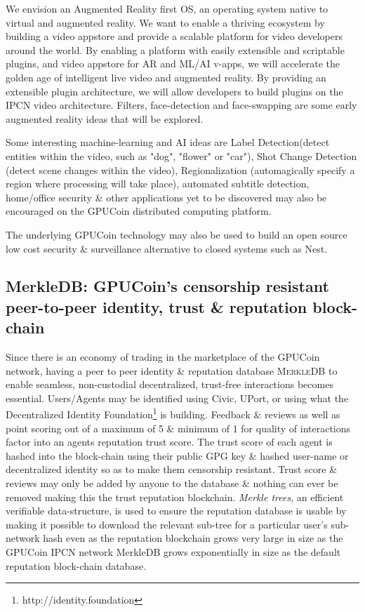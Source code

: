 \documentclass{article}
\begin{document}
We envision an Augmented Reality first OS, an operating system native to virtual and augmented reality. We want to enable a thriving ecosystem by building a video appstore and provide a scalable platform for video developers around the world. By enabling a platform with easily extensible and scriptable plugins, and video appstore for AR and ML/AI v-apps, we will accelerate the golden age of intelligent live video and augmented reality. By providing an extensible plugin architecture, we will allow developers to build plugins on the IPCN video architecture. Filters, face-detection and face-swapping are some early augmented reality ideas that will be explored.

Some interesting machine-learning and AI ideas are Label Detection(detect entities within the video, such as "dog", "flower" or "car"), Shot Change Detection (detect scene changes within the video), Regionalization (automagically specify a region where processing will take place), automated subtitle detection, home/office security \& other applications yet to be discovered may also be encouraged on the GPUCoin distributed computing platform.


The underlying GPUCoin technology may also be used to build an open source low cost security \& surveillance alternative to closed systems such as Nest.


\subsection{MerkleDB: GPUCoin's censorship resistant peer-to-peer identity, trust \& reputation block-chain}
Since there is an economy of trading in the marketplace of the GPUCoin network, having a peer to peer identity \& reputation database \textsc{MerkleDB} to enable seamless, non-custodial decentralized, trust-free interactions becomes essential. Users/Agents may be identified using Civic, UPort, or using what the Decentralized Identity Foundation\footnote{http://identity.foundation} is building. Feedback \& reviews as well as point scoring out of a maximum of 5 \& minimum of 1 for quality of interactions factor into an agents reputation trust score. The trust score of each agent is hashed into the block-chain using their public GPG key \& hashed user-name or decentralized identity so as to make them censorship resistant. Trust score \& reviews may only be added by anyone to the database \& nothing can ever be removed making this the trust reputation blockchain. \emph{Merkle trees}, an efficient verifiable data-structure, is used to ensure the reputation database is usable by making it possible to download the relevant sub-tree for a particular user's sub-network hash even as the reputation blockchain grows very large in size as the GPUCoin IPCN network MerkleDB grows exponentially in size as the default reputation block-chain database.

\end{document}
